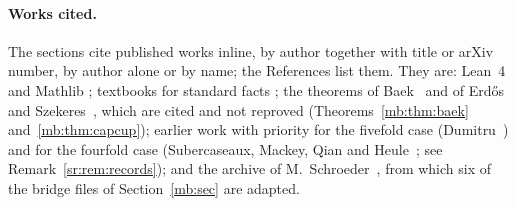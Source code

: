 \documentclass[10pt]{amsart}
\begin{document}
\paragraph{Works cited.}
The sections cite published works inline, by author together with title or arXiv number, by author alone or by
name; the References list them. They are: Lean~4
\cite{Lean4} and Mathlib \cite{Mathlib}; textbooks for standard facts \cite{Roc70,Rud76}; the theorems of
Baek~\cite{Bae25} and of Erd\H{o}s and Szekeres~\cite{ES35}, which are cited and not reproved
(Theorems~\ref{mb:thm:baek} and~\ref{mb:thm:capcup}); earlier work with priority for the fivefold case
(Dumitru~\cite{Dum25}) and for the fourfold case (Subercaseaux, Mackey, Qian and Heule~\cite{SMQH25}; see
Remark~\ref{sr:rem:records}); and the archive of M.~Schroeder~\cite{Sch26}, from which six of the bridge files of
Section~\ref{mb:sec} are adapted.














\appendix
\begingroup\esmapbreaks

\endgroup


\end{document}
